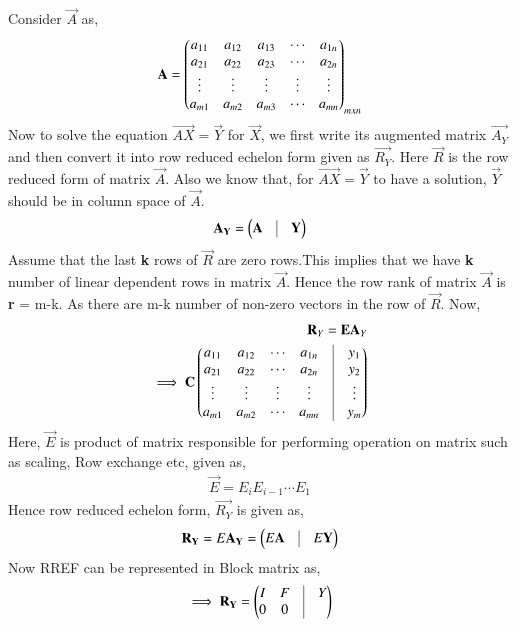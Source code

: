 Consider $\vec{A}$ as,
\begin{align}
\mathbf{A} = \begin{pmatrix}a_{11}&a_{12}&a_{13}&\cdots&a_{1n}\\a_{21}&a_{22}&a_{23}&\cdots&a_{2n}\\\vdots&\vdots&\vdots&\vdots&\vdots\\a_{m1}&a_{m2}&a_{m3}&\cdots&a_{mn}\end{pmatrix}_{mxn}
\end{align} 
Now to solve the equation $\vec{AX}=\vec{Y}$ for $\vec{X}$, we first write its augmented matrix $\vec{A_Y}$ and then convert it into row reduced echelon form given as $\vec{R_Y}$. Here $\vec{R}$ is the row reduced form of matrix $\vec{A}$. Also we know that, for $\vec{AX}=\vec{Y}$ to have a solution, $\vec{Y}$ should be in column space of $\vec{A}$.
\begin{align}
\vec{A_Y}=\myvec{\vec{A}&\vrule&\vec{Y}}
\end{align} 
Assume that the last \textbf{k} rows of $\vec{R}$ are zero rows.This implies that we have \textbf{k} number of linear dependent rows in matrix $\vec{A}$. Hence the row rank of matrix $\vec{A}$ is \textbf{r} = m-k. As there are m-k number of non-zero vectors in the row of $\vec{R}$. Now, 
\begin{align}
\vec{R}_{Y} = \vec{EA}_{Y} \\ \implies \vec{C} \myvec{a_{11}&a_{12}&\cdots&a_{1n}&\vrule&y_{1} \\a_{21}&a_{22}&\cdots&a_{2n}&\vrule&y_{2}\\\vdots&\vdots&\vdots&\vdots&\vrule&\vdots\\a_{m1}&a_{m2}&\cdots&a_{mn}&\vrule&y_{m}}
\end{align}
Here, $\vec{E}$ is product of matrix responsible for performing operation on matrix such as scaling, Row exchange etc, given as, 
\begin{align}
\vec{E} = E_iE_{i-1} \cdots E_1
\end{align}
Hence row reduced echelon form, $\vec{R_Y}$ is given as,
\begin{align}
\vec{R_Y} = E\vec{A_Y} = \myvec{E\vec{A}&\vrule&E\vec{Y}}
\end{align}
Now RREF can be represented in Block matrix as,
\begin{align}
\implies \vec{R_Y} = \myvec{I&F&\vrule&Y\\0&0&\vrule} \label{eq:solutions/2/5/7/rref}
\end{align}
\begin{comment}\myvec{1&a'_{12}&\cdots&a'_{1n}&\vrule&y'_{1} \\0&1&\cdots&a_{2n}&\vrule&y'_{2}\\\vdots&\vdots&\vdots&\vdots&\vrule&\vdots\\0&0&\cdots&0&\vrule&y'_{m-k}\\\vdots&\vdots&\ddots&\vdots&\vrule&\vdots\\0&0&\cdots&0&\vrule&y'_{m-1}\\0&0&\cdots&0&\vrule&y'_{m}}\end{comment}
